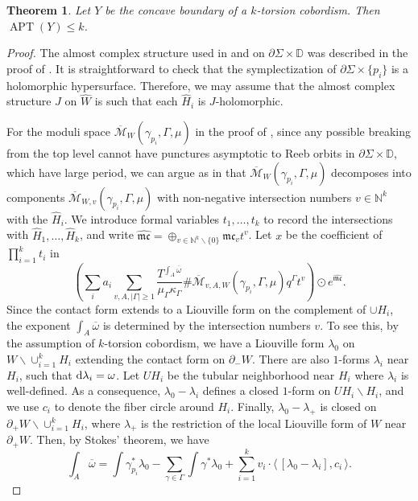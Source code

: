\documentclass[11pt]{amsart}
\numberwithin{equation}{section}
\newtheorem{theorem}{\textbf{Theorem}}[section]
\def\N{{\mathbb N}}
\def\D{{\mathbb D}}
\def\cM{{\mathcal M}}
\def\mc{{\mathfrak {mc}}}
\def\rd{{\rm d}}
\def\la{\langle\,}
\def\ra{\,\rangle}
\DeclareMathOperator{\APT}{APT}
\begin{document}
\begin{theorem}\label{thm:finite_APT_k}
    Let $Y$ be the concave boundary of a $k$-torsion cobordism. Then $\APT(Y)\le k$.
\end{theorem}
\begin{proof}
The almost complex structure used in  and  on $\partial \Sigma \times \D$ was described in the proof of \cite[Lemma 4.6]{bowden2022tight}. It is straightforward to check that the symplectization of $\partial \Sigma \times \{p_i\}$ is a holomorphic hypersurface. Therefore, we may assume that the almost complex structure $J$ on $\widehat{W}$ is such that each $\widehat{H}_i$ is $J$-holomorphic. 

For the moduli space $\overline{\cM}_W(\gamma_{p_i},\Gamma, \mu)$ in the proof of , since any possible breaking from the top level cannot have punctures asymptotic to Reeb orbits in $\partial \Sigma \times \D$, which have large period, we can argue as in  that $\overline{\cM}_W(\gamma_{p_i},\Gamma, \mu)$ decomposes into components $\overline{\cM}_{W,v}(\gamma_{p_i},\Gamma, \mu)$ with non-negative intersection numbers $v\in \N^k$ with the $\widehat{H}_i$. We introduce formal variables $t_1,\ldots,t_k$ to record the intersections with $\widehat{H}_1,\ldots,\widehat{H}_k$, and write $\hat{\mc}= \oplus_{v\in \N^k\backslash\{0\}}\mc_vt^v$. Let $x$ be the coefficient of $\prod_{i=1}^k t_i$ in 
$$\left(\sum_i a_i \sum_{v, A,|\Gamma|\ge 1} \frac{T^{\int_A \overline{\omega}}}{\mu_{\Gamma}\kappa_{\Gamma}}\#\overline{\cM}_{v,A,W}(\gamma_{p_i},\Gamma, \mu)q^{\Gamma}t^v\right)\odot e^{\hat{\mc}}. $$
Since the contact form extends to a Liouville form on the complement of $\cup H_i$, the exponent $\int_A\overline{\omega}$ is determined by the intersection numbers $v$. To see this, by the assumption of $k$-torsion cobordism, we have a Liouville form $\lambda_0$ on $W\backslash \cup_{i=1}^kH_i$ extending the contact form on $\partial_-W$. There are also $1$-forms $\lambda_i$ near $H_i$, such that $\rd \lambda_i = \omega$. Let $UH_i$ be the tubular neighborhood near $H_i$ where $\lambda_i$ is well-defined. As a consequence, $\lambda_0-\lambda_i$ defines a closed $1$-form on $UH_i\backslash H_i$, and we use $c_i$ to denote the fiber circle around $H_i$. Finally, $\lambda_0-\lambda_+$ is closed on $\partial_+W \backslash \cup_{i=1}^k H_i$, where $\lambda_+$ is the restriction of the local Liouville form of $W$ near $\partial_+W$. Then, by Stokes' theorem, we have 
$$\int_A \overline{\omega} = \int \gamma_{p_i}^*\lambda_0 -\sum_{\gamma \in \Gamma}\int \gamma^*\lambda_0 + \sum_{i=1}^kv_i\cdot \la [\lambda_0-\lambda_i],c_i \ra. $$

\end{proof}
\end{document}
